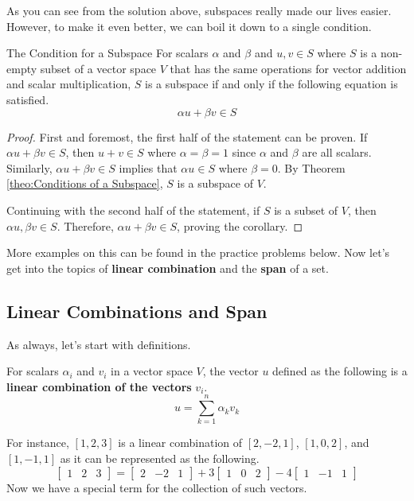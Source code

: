 \documentclass[../main.tex]{subfiles}
\begin{document}
As you can see from the solution above, subspaces really made our
lives easier. However, to make it even better, we can boil it down
to a single condition.

\begin{corollary}{The Condition for a Subspace}
For scalars $\alpha$ and $\beta$ and $u, v \in S$ where $S$ is a
non-empty subset of a vector space $V$ that has the same operations
for vector addition and scalar multiplication, $S$ is a subspace if
and only if the following equation is satisfied.
\[
\alpha u + \beta v \in S
\]
\end{corollary}
\begin{proof}
First and foremost, the first half of the statement can be proven.
If $\alpha u + \beta v \in S$, then $u + v \in S$ where $\alpha =
\beta = 1$ since $\alpha$ and $\beta$ are all scalars. Similarly,
$\alpha u + \beta v \in S$ implies that $\alpha u \in S$ where
$\beta = 0$. By Theorem \ref{theo:Conditions of a Subspace}, $S$ is a
subspace of $V$.

Continuing with the second half of the statement, if $S$ is a subset
of $V$, then $\alpha u, \beta v \in S$. Therefore, $\alpha u +
\beta v \in S$, proving the corollary.
\end{proof}

More examples on this can be found in the practice problems below.
Now let's get into the topics of \textbf{linear combination} and the
\textbf{span} of a set.

\subsection{Linear Combinations and Span}

As always, let's start with definitions.

\begin{definition}
For scalars $\alpha_i$ and $v_i$ in a vector space $V$, the vector
$u$ defined as the following is a \textbf{linear combination of the
vectors} $v_i$.
\[
u = \sum_{k = 1}^n \alpha_k v_k
\]
\end{definition}

For instance, $[1, 2, 3]$ is a linear combination of $[2, -2, 1]$,
$[1, 0, 2]$, and $[1, -1, 1]$ as it can be represented as the
following.
\[
\begin{bmatrix}
    1 & 2 & 3
\end{bmatrix}
=
\begin{bmatrix}
    2 & -2 & 1
\end{bmatrix}
+
3\begin{bmatrix}
    1 & 0 & 2
\end{bmatrix}
-
4\begin{bmatrix}
    1 & -1 & 1
\end{bmatrix}
\]
Now we have a special term for the collection of such vectors.
\end{document}
